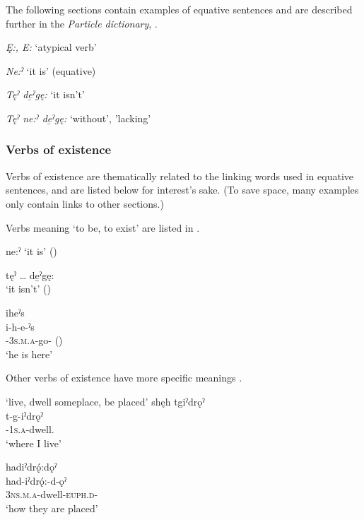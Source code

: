 The following sections contain examples of equative sentences and are described further in the \textit{Particle dictionary}, .

\begin{CayugaRelated}
\item{}\textit{Ę:, E:} `atypical verb’\\
\item{}\textit{Ne:ˀ} ‘it is’ (equative)\\
\item{}\textit{Tęˀ de̱ˀgę:} ‘it isn't’\\
\item{}\textit{Tęˀ ne:ˀ de̱ˀgę:} ‘without’, 'lacking’
\end{CayugaRelated}

\subsubsection*{Verbs of existence} \label{Verbs of existence}
Verbs of existence are thematically related to the linking words used in equative sentences, and are listed below for interest’s sake. (To save space, many examples only contain links to other sections.)

Verbs meaning ‘to be, to exist’ are listed in . 

\ea\label{ex:vexist}
\ea ne:ˀ ‘it is’ ()

\ex tęˀ … de̱ˀgę:\\
\glt ‘it isn't’ ()

\ex iheˀs\\
\gll i-h-e-ˀs\\
 {\prothetic}-\textsc{3s.m.a}-go-{\habitual} ()\\
\glt `he is here'
\z
\z


Other verbs of existence have more specific meanings .

\ea\label{ex:vexist2}  ‘live, dwell someplace, be placed’
\ea shęh tgiˀdrǫˀ\\
\gll t-g-iˀdrǫˀ\\
 {\cislocative}-\textsc{1s.a}-dwell.{\stative}\\
\glt `where I live'

\ex hadiˀdrǫ́:dǫˀ\\
\gll had-iˀdrǫ́:-d-ǫˀ\\
 \textsc{3ns.m.a}-dwell-\textsc{euph.d}-{\distributive}\\
\glt `how they are placed'

